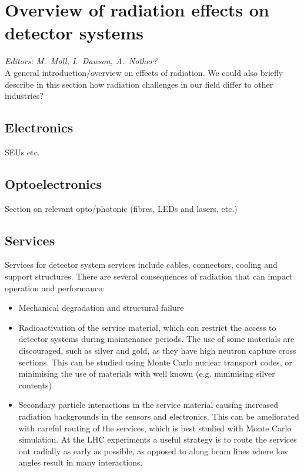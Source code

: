 \section{Overview of radiation effects on detector systems}
\label{sec:effects}
{\it Editors: M.~Moll, I.~Dawson, A.~Nother?}  \\

\noindent
A general introduction/overview on effects of radiation. We could also briefly describe in this section how radiation challenges in our field differ to other industries?




\subsection{Electronics}
SEUs etc.

\subsection{Optoelectronics}
Section on relevant opto/photonic (fibres, LEDs and lasers, etc.)

\subsection{Services}
Services for detector system services include cables, connectors, cooling and support structures. There are several consequences of radiation that can impact operation and performance:
\begin{itemize}
\item Mechanical degradation and structural failure 
\item Radioactivation of the service material, which can restrict the access to detector systems during maintenance periods. The use of some materials are discouraged, such as silver and gold, as they have high neutron capture cross sections. This can be studied using Monte Carlo nuclear transport codes, or minimising the use of materials with well known  (e.g. minimising silver contents)
\item Secondary particle interactions in the service material causing increased radiation backgrounds in the sensors and electronics. This can be ameliorated with careful routing of the services, which is best studied with Monte Carlo simulation. At the LHC experiments a useful strategy is to route the services out radially as early as possible, as opposed to along beam lines where low angles result in many interactions.


\end{itemize} 


\begin{thebibliography}{99}
\end{thebibliography}
